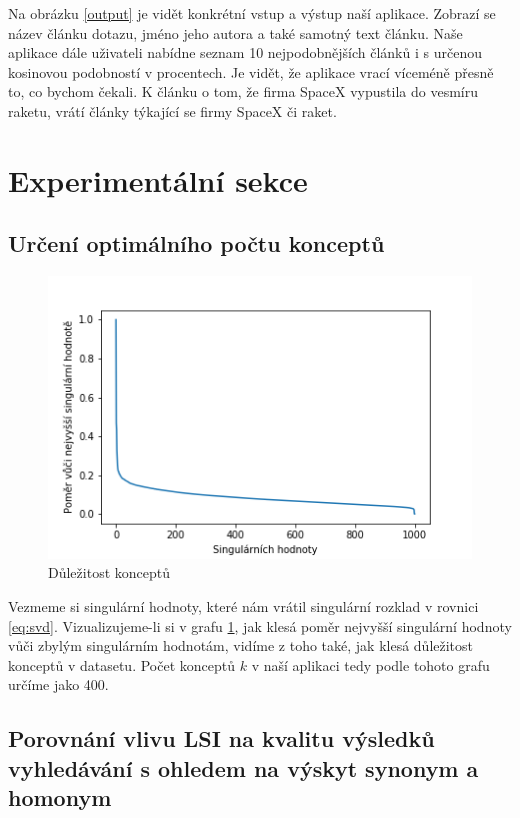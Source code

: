 \documentclass[11pt]{scrartcl} %
\begin{document}
Na obrázku \ref{output} je vidět konkrétní vstup a výstup naší aplikace. Zobrazí se název článku dotazu, jméno jeho autora a také samotný text článku. Naše aplikace dále uživateli nabídne seznam 10 nejpodobnějších článků i s určenou kosinovou podobností v procentech. Je vidět, že aplikace vrací víceméně přesně to, co bychom čekali. K článku o tom, že firma SpaceX vypustila do vesmíru raketu, vrátí články týkající se firmy SpaceX či raket.

\section{Experimentální sekce}

\subsection{Určení optimálního počtu konceptů}

\begin{figure}[h] %
	\centering
	\includegraphics[width=0.7\columnwidth]{images/singular_values.png}
	\caption{Důležitost konceptů}
	\label{concepts}
\end{figure}

Vezmeme si singulární hodnoty, které nám vrátil singulární rozklad v rovnici \ref{eq:svd}. Vizualizujeme-li si v grafu \ref{concepts}, jak klesá poměr nejvyšší singulární hodnoty vůči zbylým singulárním hodnotám, vidíme z toho také, jak klesá důležitost konceptů v datasetu. Počet konceptů $k$ v naší aplikaci tedy podle tohoto grafu určíme jako 400.

\subsection{Porovnání vlivu LSI na kvalitu výsledků vyhledávání s ohledem na výskyt synonym a homonym}
\end{document}
